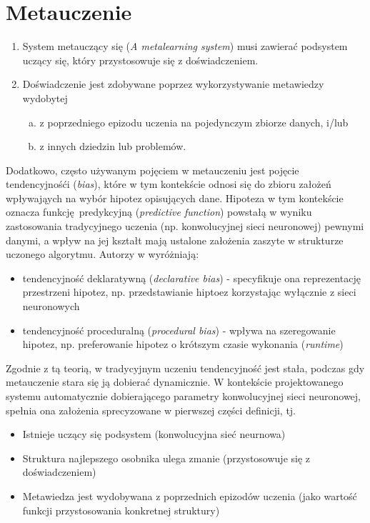 \section{Metauczenie}
\begin{enumerate}
	\item System metauczący się (\textit{A metalearning system}) musi zawierać podsystem uczący się, który przystosowuje się z doświadczeniem.
	\item Doświadczenie jest zdobywane poprzez wykorzystywanie metawiedzy wydobytej
	\begin{enumerate}[a)]
		\item z poprzedniego epizodu uczenia na pojedynczym zbiorze danych, i/lub
		\item z innych dziedzin lub problemów.
	\end{enumerate}
\end{enumerate}
Dodatkowo, często używanym pojęciem w metauczeniu jest pojęcie tendencyjnośći (\textit{bias}), które w tym kontekście odnosi się do zbioru założeń wpływająych na wybór hipotez opisujących dane. \cite{Lemke2015}
Hipoteza w tym kontekście oznacza funkcję predykcyjną (\textit{predictive function}) powstałą w wyniku zastosowania tradycyjnego uczenia (np. konwolucyjnej sieci neuronowej) pewnymi danymi, a wpływ na jej kształt mają ustalone założenia zaszyte w strukturze uczonego algorytmu. \cite[s.2]{Brazdil2009}
Autorzy w \cite{Brazdil2009} wyróżniają:
\begin{itemize}
	\item tendencyjność deklaratywną (\textit{declarative bias}) - specyfikuje ona reprezentację przestrzeni hipotez, np. przedstawianie hiptoez korzystając wyłącznie z sieci neuronowych
	\item tendencyjność proceduralną (\textit{procedural bias}) - wpływa na szeregowanie hipotez, np. preferowanie hipotez o krótszym czasie wykonania (\textit{runtime})
\end{itemize}
Zgodnie z tą teorią, w tradycyjnym uczeniu tendencyjność jest stała, podczas gdy metauczenie stara się ją dobierać dynamicznie. \cite{Lemke2015}
W kontekście projektowanego systemu automatycznie dobierającego parametry konwolucyjnej sieci neuronowej, spełnia ona założenia sprecyzowane w pierwszej części definicji, tj.
\begin{itemize}
	\item Istnieje uczący się podsystem (konwolucyjna sieć neurnowa)
	\item Struktura najlepszego osobnika ulega zmanie (przystosowuje się z doświadczeniem)
	\item Metawiedza jest wydobywana z poprzednich epizodów uczenia (jako wartość funkcji przystosowania konkretnej struktury)
\end{itemize}
